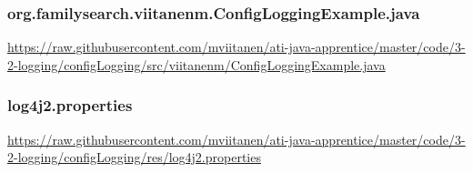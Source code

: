 \vspace{1em}
\subsubsection*{org.familysearch.viitanenm.ConfigLoggingExample.java}
\noindent
\begin{minipage}{.6in}
\end{minipage}
\begin{minipage}{6in}
  \url{https://raw.githubusercontent.com/mviitanen/ati-java-apprentice/master/code/3-2-logging/configLogging/src/viitanenm/ConfigLoggingExample.java}
\end{minipage}

\vspace{1em}
\subsubsection*{log4j2.properties}
\noindent
\begin{minipage}{.6in}
\end{minipage}
\begin{minipage}{6in}
  \url{https://raw.githubusercontent.com/mviitanen/ati-java-apprentice/master/code/3-2-logging/configLogging/res/log4j2.properties}
\end{minipage}